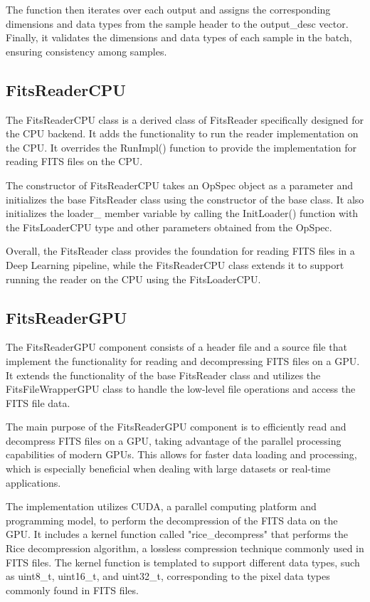 \documentclass[licencjacka,en]{pracamgr}
\begin{document}
The function then iterates over each output and assigns the corresponding dimensions and data types from the sample header to the output\_desc vector. Finally, it validates the dimensions and data types of each sample in the batch, ensuring consistency among samples.


\subsection{FitsReaderCPU}
The FitsReaderCPU class is a derived class of FitsReader specifically designed for the CPU backend. It adds the functionality to run the reader implementation on the CPU. It overrides the RunImpl() function to provide the implementation for reading FITS files on the CPU.

The constructor of FitsReaderCPU takes an OpSpec object as a parameter and initializes the base FitsReader class using the constructor of the base class. It also initializes the loader\_ member variable by calling the InitLoader() function with the FitsLoaderCPU type and other parameters obtained from the OpSpec.

Overall, the FitsReader class provides the foundation for reading FITS files in a Deep Learning pipeline, while the FitsReaderCPU class extends it to support running the reader on the CPU using the FitsLoaderCPU.

\subsection{FitsReaderGPU}

The FitsReaderGPU component consists of a header file and a source file that implement the functionality for reading and decompressing FITS files on a GPU. It extends the functionality of the base FitsReader class and utilizes the FitsFileWrapperGPU class to handle the low-level file operations and access the FITS file data.

The main purpose of the FitsReaderGPU component is to efficiently read and decompress FITS files on a GPU, taking advantage of the parallel processing capabilities of modern GPUs. This allows for faster data loading and processing, which is especially beneficial when dealing with large datasets or real-time applications.

The implementation utilizes CUDA, a parallel computing platform and programming model, to perform the decompression of the FITS data on the GPU. It includes a kernel function called "rice\_decompress" that performs the Rice decompression algorithm, a lossless compression technique commonly used in FITS files. The kernel function is templated to support different data types, such as uint8\_t, uint16\_t, and uint32\_t, corresponding to the pixel data types commonly found in FITS files.
\end{document}
